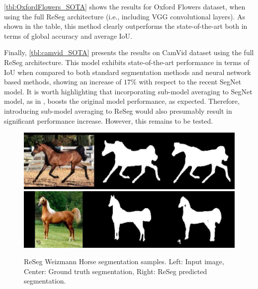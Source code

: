 \autoref{tbl:OxfordFlowers_SOTA} shows the results for Oxford Flowers dataset,
when using the full ReSeg architecture (i.e., including VGG convolutional
layers).  As shown in the table, this method clearly outperforms the
state-of-the-art both in terms of global accuracy and average IoU.

Finally, \autoref{tbl:camvid_SOTA} presents the results on CamVid dataset using
the full ReSeg architecture. This model exhibits state-of-the-art performance
in terms of IoU when compared to both standard segmentation methods and neural
network based methods, showing an increase of $17\%$ with respect to the recent
SegNet model. It is worth highlighting that incorporating sub-model averaging
to SegNet model, as in \citep{Kendall2015bayesiansegnet}, boosts the original
model performance, as expected. Therefore, introducing sub-model averaging to
ReSeg would also presumably result in significant performance increase.
However, this remains to be tested.


\begin{figure}[t!]
    \centering
    \includegraphics[width=\textwidth]{img/reseg/samples/horse1.pdf}\\
    \vspace{0.1em}
    \includegraphics[width=\textwidth]{img/reseg/samples/horse2.pdf}
    \caption{ReSeg Weizmann Horse segmentation samples.
        Left: Input image, Center: Ground truth segmentation,
        Right: ReSeg predicted segmentation.}
    \label{fig:reseg_samples_horses}
\end{figure}


